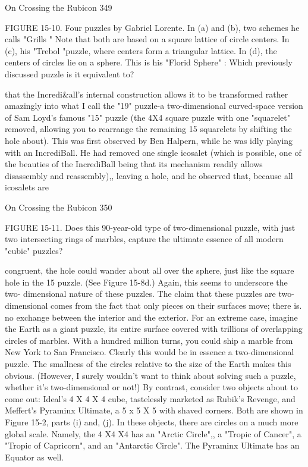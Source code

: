 On Crossing the Rubicon                                                              349

FIGURE 15-10. Four puzzles by Gabriel Lorente. In (a) and (b), two schemes he
calls "Grills " Note that both are based on a square lattice of circle centers. In (c),
his "Trebol "puzzle, where centers form a triangular lattice. In (d), the centers of
circles lie on a sphere. This is his "Florid Sphere" : Which previously discussed
puzzle is it equivalent to?

that the Incredi\&all's internal construction allows it to be transformed rather
amazingly into what I call the "19" puzzle-a two-dimensional curved-space version
of Sam Loyd's famous "15" puzzle (the 4X4 square puzzle with one "squarelet"
removed, allowing you to rearrange the remaining 15 squarelets by shifting the
hole about). This was first observed by Ben Halpern, while he was idly playing
with an IncrediBall. He had removed one single icosalet (which is possible, one of
the beauties of the IncrediBall being that its mechanism readily allows disassembly
and reassembly),, leaving a hole, and he observed that, because all icosalets are




On Crossing the Rubicon                                                               350

FIGURE 15-11. Does this 90-year-old type of two-dimensional puzzle, with just
two intersecting rings of marbles, capture the ultimate essence of all modern
"cubic" puzzles?

congruent, the hole could wander about all over the sphere, just like the square
hole in the 15 puzzle. (See Figure 15-8d.) Again, this seems to underscore the two-
dimensional nature of these puzzles.
        The claim that these puzzles are two-dimensional comes from the fact that
only pieces on their surfaces move; there is. no exchange between the interior and
the exterior. For an extreme case, imagine the Earth as a giant puzzle, its entire
surface covered with trillions of overlapping circles of marbles. With a hundred
million turns, you could ship a marble from New York to San Francisco. Clearly
this would be in essence a two-dimensional puzzle. The smallness of the circles
relative to the size of the Earth makes this obvious. (However, I surely wouldn't
want to think about solving such a puzzle, whether it's two-dimensional or not!)
        By contrast, consider two objects about to come out: Ideal's 4 X 4 X 4 cube,
tastelessly marketed as Rubik's Revenge, and Meffert's Pyraminx Ultimate, a 5 x 5
X 5 with shaved corners. Both are shown in Figure 15-2, parts (i) and, (j). In these
objects, there are circles on a much more global scale. Namely, the 4 X4 X4 has an
"Arctic Circle",, a "Tropic of Cancer", a "Tropic of Capricorn", and an "Antarctic
Circle". The Pyraminx Ultimate has an Equator as well.




